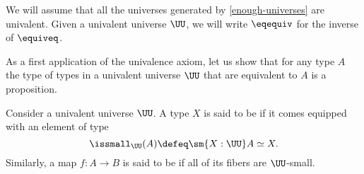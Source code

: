 \begin{axiom}\label{axiom:univalence}
  We will assume that all the universes generated by \cref{enough-universes} are univalent. Given a univalent universe $\UU$, we will write $\eqequiv$ for the inverse of $\equiveq$.
\end{axiom}

As a first application of the univalence axiom, let us show that for any type $A$ the type of types in a univalent universe $\UU$ that are equivalent to $A$ is a proposition.

\begin{defn}\label{defn:small-types}
  Consider a univalent universe $\UU$. A type $X$ is said to be  if it comes equipped with an element of type
  \begin{equation*}
    \issmall_\UU(A)\defeq\sm{X:\UU}A\simeq X.
  \end{equation*}
  Similarly, a map $f:A\to B$ is said to be  if all of its fibers are $\UU$-small.
\end{defn}

